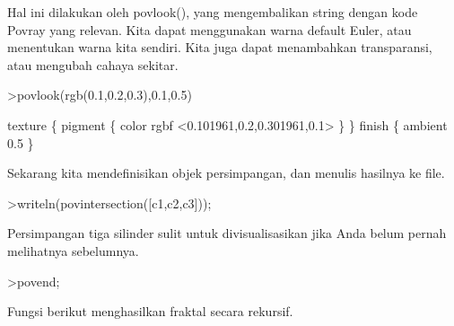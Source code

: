 \documentclass{article}
\begin{document}
\begin{eulernotebook}
\begin{eulercomment}
\begin{eulercomment}
\begin{eulercomment}
\begin{eulercomment}
\begin{eulercomment}
Hal ini dilakukan oleh povlook(), yang mengembalikan string dengan
kode Povray yang relevan. Kita dapat menggunakan warna default Euler,
atau menentukan warna kita sendiri. Kita juga dapat menambahkan
transparansi, atau mengubah cahaya sekitar.
\end{eulercomment}
\begin{eulerprompt}
>povlook(rgb(0.1,0.2,0.3),0.1,0.5)
\end{eulerprompt}
\begin{euleroutput}
   texture \{ pigment \{ color rgbf <0.101961,0.2,0.301961,0.1> \}  \} 
   finish \{ ambient 0.5 \} 
  
\end{euleroutput}
\begin{eulercomment}
Sekarang kita mendefinisikan objek persimpangan, dan menulis hasilnya
ke file.
\end{eulercomment}
\begin{eulerprompt}
>writeln(povintersection([c1,c2,c3]));
\end{eulerprompt}
\begin{eulercomment}
Persimpangan tiga silinder sulit untuk divisualisasikan jika Anda
belum pernah melihatnya sebelumnya.
\end{eulercomment}
\begin{eulerprompt}
>povend;
\end{eulerprompt}
\begin{eulercomment}
Fungsi berikut menghasilkan fraktal secara rekursif.


\end{eulercomment}
\end{eulercomment}
\end{eulercomment}
\end{eulercomment}
\end{eulercomment}
\end{eulernotebook}
\end{document}
